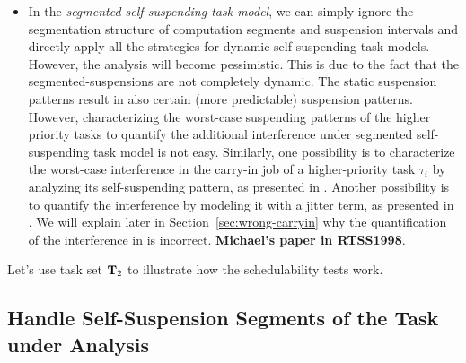 \begin{table}[t]
\begin{table}[t]
\begin{itemize}
\item In the \emph{segmented self-suspending task model}, we can simply ignore the segmentation structure of computation segments and suspension intervals and directly apply all the strategies for dynamic self-suspending task models. However, the analysis will become pessimistic. This is due to the fact that the segmented-suspensions are not completely dynamic. The static suspension patterns result in also certain (more predictable) suspension patterns. However, characterizing the worst-case suspending patterns of the higher priority tasks to quantify the additional interference under segmented self-suspending task model is not easy. Similarly, one possibility is to characterize the worst-case interference in the carry-in job of a higher-priority task $\tau_i$ by analyzing its self-suspending pattern, as presented in \cite{Huang:multiseg}. Another possibility is to  quantify the interference by modeling it with a jitter term, as presented in \cite{RTCSA-BletsasA05}. We will explain later in Section~\ref{sec:wrong-carryin} why the quantification of the interference in \cite{RTCSA-BletsasA05} is incorrect. {\bf Michael's paper in RTSS1998}.
\end{itemize}


Let's use task set ${\bf T}_2$ to illustrate how the schedulability tests work. 
 
\subsection{Handle Self-Suspension Segments of the Task under Analysis}


\end{table}
\end{table}
